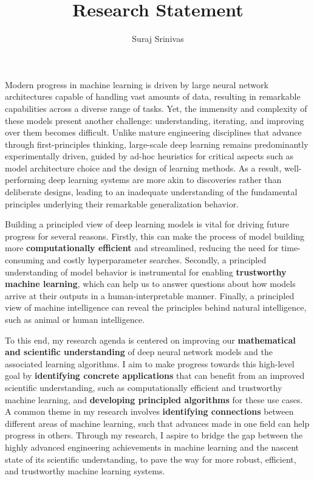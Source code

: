 \documentclass{article}
\title{Research Statement}
\author{Suraj Srinivas}
\date{}
\begin{document}
\pagecolor{floralwhite}
\maketitle

\noindent Modern progress in machine learning is driven by large neural network architectures capable of handling vast amounts of data, resulting in remarkable capabilities across a diverse range of tasks. Yet, the immensity and complexity of these models present another challenge: understanding, iterating, and improving over them becomes difficult. Unlike mature engineering disciplines that advance through first-principles thinking, large-scale deep learning remains predominantly experimentally driven, guided by ad-hoc heuristics for critical aspects such as model architecture choice and the design of learning methods. As a result, well-performing deep learning systems are more akin to discoveries rather than deliberate designs, leading to an inadequate understanding of the fundamental principles underlying their remarkable generalization behavior.

\vspace*{0.3cm}
\noindent Building a principled view of deep learning models is vital for driving future progress for several reasons. Firstly, this can make the process of model building more \textbf{computationally efficient} and streamlined, reducing the need for time-consuming and costly hyperparameter searches. Secondly, a principled understanding of model behavior is instrumental for enabling \textbf{trustworthy machine learning}, which can help us to answer questions about how models arrive at their outputs in a human-interpretable manner. Finally, a principled view of machine intelligence can reveal the principles behind natural intelligence, such as animal or human intelligence.

\vspace*{0.3cm}
\noindent To this end, my research agenda is centered on improving our \textbf{mathematical and scientific understanding} of deep neural network models and the associated learning algorithms. I aim to make progress towards this high-level goal by \textbf{identifying concrete applications} that can benefit from an improved scientific understanding, such as computationally efficient and trustworthy machine learning, and \textbf{developing principled algorithms} for these use cases. A common theme in my research involves \textbf{identifying connections} between different areas of machine learning, such that advances made in one field can help progress in others. Through my research, I aspire to bridge the gap between the highly advanced engineering achievements in machine learning and the nascent state of its scientific understanding, to pave the way for more robust, efficient, and trustworthy machine learning systems.
 
\end{document}
